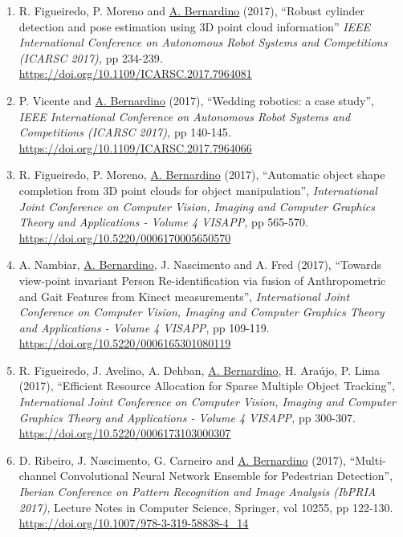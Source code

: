 \begin{enumerate}
  C. Cardoso and \ul{A. Bernardino} (2017), ``Adaptive Non-Maximal
  Suppression Filtering for Online Exploration Learning with
  Cost-Regularized Kernel Regression'', \emph{IEEE International
  Conference on Autonomous Robot Systems and Competitions (ICARSC
  2017),} pp 272-277\emph{.}
  \url{https://doi.org/10.1109/ICARSC.2017.7964087}~
\item
  R. Figueiredo, P. Moreno and \ul{A. Bernardino} (2017), ``Robust
  cylinder detection and pose estimation using 3D point cloud
  information'' \emph{IEEE International Conference on Autonomous Robot
  Systems and Competitions (ICARSC 2017),} pp 234-239\emph{.}
  \url{https://doi.org/10.1109/ICARSC.2017.7964081}~
\item
  P. Vicente and \ul{A. Bernardino} (2017), ``Wedding robotics: a case
  study'', \emph{IEEE International Conference on Autonomous Robot
  Systems and Competitions (ICARSC 2017),} pp 140-145\emph{.}
  \url{https://doi.org/10.1109/ICARSC.2017.7964066}~
\item
  R. Figueiredo, P. Moreno, \ul{A. Bernardino} (2017), ``Automatic
  object shape completion from 3D point clouds for object
  manipulation'', \emph{International Joint Conference on Computer
  Vision, Imaging and Computer Graphics Theory and Applications - Volume
  4 VISAPP,} pp 565-570. \url{https://doi.org/10.5220/0006170005650570}~
\item
  A. Nambiar, \ul{A. Bernardino}, J. Nascimento and A. Fred (2017),
  ``Towards view-point invariant Person Re-identification via fusion of
  Anthropometric and Gait Features from Kinect measurements'',
  \emph{International Joint Conference on Computer Vision, Imaging and
  Computer Graphics Theory and Applications - Volume 4 VISAPP}, pp
  109-119. \url{https://doi.org/10.5220/0006165301080119}~
\item
  R. Figueiredo, J. Avelino, A. Dehban, \ul{A. Bernardino}, H. Araújo,
  P. Lima (2017), ``Efficient Resource Allocation for Sparse Multiple
  Object Tracking'', \emph{International Joint Conference on Computer
  Vision, Imaging and Computer Graphics Theory and Applications - Volume
  4 VISAPP,} pp 300-307. \url{https://doi.org/10.5220/0006173103000307}~
\item
  D. Ribeiro, J. Nascimento, G. Carneiro and \ul{A. Bernardino} (2017),
  ``Multi-channel Convolutional Neural Network Ensemble for Pedestrian
  Detection'', \emph{Iberian Conference on Pattern Recognition and Image
  Analysis (IbPRIA 2017),} Lecture Notes in Computer Science, Springer,
  vol 10255, pp 122-130.
  \url{https://doi.org/10.1007/978-3-319-58838-4_14}~

\end{enumerate}
